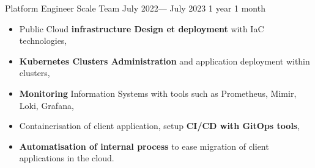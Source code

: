 \jobposition%
{Platform Engineer}%
{Scale Team}
{July 2022--- July 2023}%
{1 year 1 month}%
{
	\begin{itemize}
		\item Public Cloud \textbf{infrastructure Design et deployment}
		      with IaC technologies,
		\item \textbf{Kubernetes Clusters Administration} and application
		      deployment within clusters,
		\item \textbf{Monitoring} Information Systems with tools such as
		      Prometheus, Mimir, Loki, Grafana,
		\item Containerisation of client application, setup \textbf{CI/CD
			      with GitOps tools},
		\item \textbf{Automatisation of internal process} to ease
		      migration of client applications in the cloud.
	\end{itemize}
}
